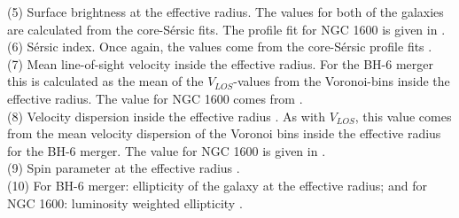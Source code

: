 \documentclass[english, oneside]{HYgradu}
\begin{document}
\begin{table}
{	(5) Surface brightness at the effective radius. The values for both of the galaxies are calculated from the core-Sérsic fits. The profile fit for NGC 1600 is given in \citep{Thomas2016}. \\
	(6) Sérsic index. Once again, the values come from the core-Sérsic profile fits \citep{Thomas2016}. \\
	(7) Mean line-of-sight velocity inside the effective radius. For the BH-6 merger this is calculated as the mean of the $V_{LOS}$-values from the Voronoi-bins inside the effective radius. The value for NGC 1600 comes from \cite{Bender1994}. \\
	(8) Velocity dispersion inside the effective radius \citep{Veale2017veldisp}. As with $V_{LOS}$, this value comes from the mean velocity dispersion of the Voronoi bins inside the effective radius for the BH-6 merger. The value for NGC 1600 is given in \cite{Veale2017veldisp}.\\
	(9) Spin parameter at the effective radius \citep{Veale2018lambda}. \\
	(10) For BH-6 merger: ellipticity of the galaxy at the effective radius; and for NGC 1600: luminosity weighted ellipticity \citep{Goullaud2018}.
	}
	\label{table:snap6_vs_NGC1600}
\end{table}
\end{document}
